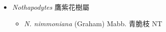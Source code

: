 
  \begin{itemize}
 \item[] \textit{Nothapodytes} 鷹紫花樹屬
                                
  \begin{itemize}
        \item[] \textit{N. nimmoniana} (Graham) Mabb.  青脆枝   NT
  \end{itemize}
  \end{itemize}
